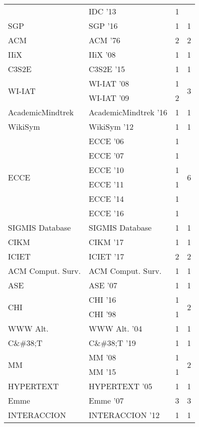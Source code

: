 \begin{table*}[t]
\begin{tabular}{llrr}
& IDC '13 & 1 &\\
\multirow{1}{*}{SGP } & SGP '16 & 1 & \multirow{1}{*}{1}\\
\multirow{1}{*}{ACM } & ACM '76 & 2 & \multirow{1}{*}{2}\\
\multirow{1}{*}{IIiX } & IIiX '08 & 1 & \multirow{1}{*}{1}\\
\multirow{1}{*}{C3S2E } & C3S2E '15 & 1 & \multirow{1}{*}{1}\\
\multirow{2}{*}{WI-IAT } & WI-IAT '08 & 1 & \multirow{2}{*}{3}\\
& WI-IAT '09 & 2 &\\
\multirow{1}{*}{AcademicMindtrek } & AcademicMindtrek '16 & 1 & \multirow{1}{*}{1}\\
\multirow{1}{*}{WikiSym } & WikiSym '12 & 1 & \multirow{1}{*}{1}\\
\multirow{6}{*}{ECCE } & ECCE '06 & 1 & \multirow{6}{*}{6}\\
& ECCE '07 & 1 &\\
& ECCE '10 & 1 &\\
& ECCE '11 & 1 &\\
& ECCE '14 & 1 &\\
& ECCE '16 & 1 &\\
\multirow{1}{*}{SIGMIS Database} & SIGMIS Database & 1 & \multirow{1}{*}{1}\\
\multirow{1}{*}{CIKM } & CIKM '17 & 1 & \multirow{1}{*}{1}\\
\multirow{1}{*}{ICIET } & ICIET '17 & 2 & \multirow{1}{*}{2}\\
\multirow{1}{*}{ACM Comput. Surv.} & ACM Comput. Surv. & 1 & \multirow{1}{*}{1}\\
\multirow{1}{*}{ASE } & ASE '07 & 1 & \multirow{1}{*}{1}\\
\multirow{2}{*}{CHI } & CHI '16 & 1 & \multirow{2}{*}{2}\\
& CHI '98 & 1 &\\
\multirow{1}{*}{WWW Alt. } & WWW Alt. '04 & 1 & \multirow{1}{*}{1}\\
\multirow{1}{*}{C\&\#38;T } & C\&\#38;T '19 & 1 & \multirow{1}{*}{1}\\
\multirow{2}{*}{MM } & MM '08 & 1 & \multirow{2}{*}{2}\\
& MM '15 & 1 &\\
\multirow{1}{*}{HYPERTEXT } & HYPERTEXT '05 & 1 & \multirow{1}{*}{1}\\
\multirow{1}{*}{Emme } & Emme '07 & 3 & \multirow{1}{*}{3}\\
\multirow{1}{*}{INTERACCION } & INTERACCION '12 & 1 & \multirow{1}{*}{1}\\

\end{tabular}
\end{table*}
